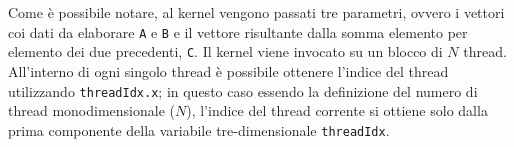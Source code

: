 Come è possibile notare, al kernel vengono passati tre parametri, ovvero i vettori coi dati da elaborare \lstinline{A} e \lstinline{B} e il vettore risultante dalla somma elemento per elemento dei due precedenti, \lstinline{C}. Il kernel viene invocato su un blocco di $N$ thread. All'interno di ogni singolo thread è possibile ottenere l'indice del thread utilizzando \lstinline{threadIdx.x}; in questo caso essendo la definizione del numero di thread monodimensionale ($N$), l'indice del thread corrente si ottiene solo dalla prima componente della variabile tre-dimensionale \lstinline{threadIdx}.